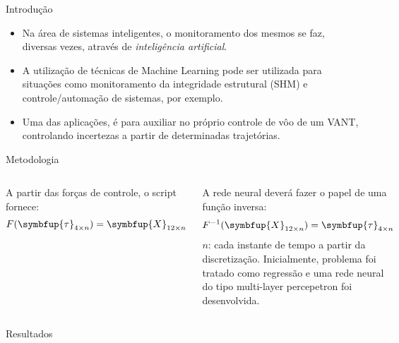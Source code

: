 \begin{frame}{Introdução}
\begin{itemize}
    \item[\bullet] Na área de sistemas inteligentes, o monitoramento dos mesmos se faz, diversas vezes, através de \emph{inteligência artificial}.

    \item[\bullet] A utilização de técnicas de Machine Learning pode ser utilizada para situações como monitoramento da integridade estrutural (SHM) e controle/automação de sistemas, por exemplo.

    \item[\bullet] Uma das aplicações, é para auxiliar no próprio controle de vôo de um VANT, controlando incertezas a partir de determinadas trajetórias.
\end{itemize}
\end{frame}
\begin{frame}{Metodologia}
\begin{columns}[t]
A partir das forças de controle, o script fornece:
%
\begin{equation}
    F(\symbfup{\tau}_{4\times n}) = \symbfup{X}_{12\times n}
\end{equation}

A rede neural deverá fazer o papel de uma função inversa:
\begin{equation}
    F^{-1}(\symbfup{X}_{12\times n}) = \symbfup{\tau}_{4\times n}
\end{equation}
\scriptsize{\(n\): cada instante de tempo a partir da discretização.}
Inicialmente, problema foi tratado como \alert{regressão} e uma rede neural do tipo multi-layer percepetron foi desenvolvida. 
%
\begin{figure}
    \centering
    
\end{figure}
\end{columns}
\end{frame}

\begin{frame}{Resultados}
\begin{figure}
\centering
{}
\end{figure}
\end{frame}

